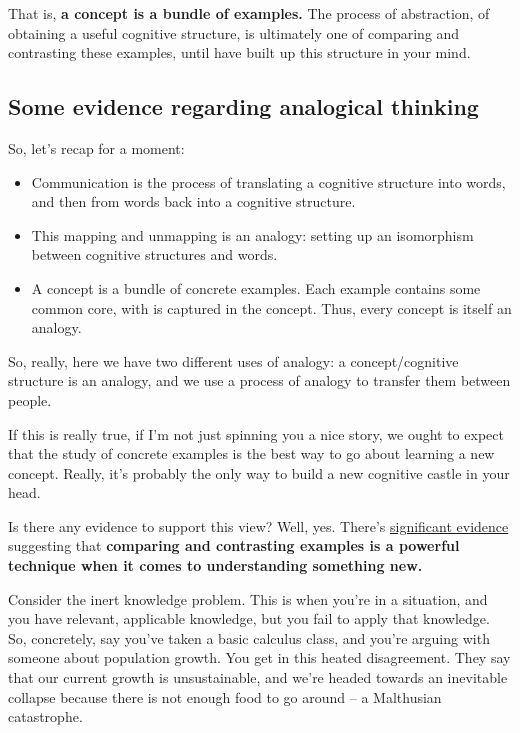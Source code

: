That is, \textbf{a concept is a bundle of examples.} The process of
abstraction, of obtaining a useful cognitive structure, is ultimately
one of comparing and contrasting these examples, until have built up
this structure in your mind.

\subsection{Some evidence regarding analogical
thinking}\label{some-evidence-regarding-analogical-thinking}

So, let's recap for a moment:

\begin{itemize}
\itemsep1pt\parskip0pt
\item
  Communication is the process of translating a cognitive structure into
  words, and then from words back into a cognitive structure.
\item
  This mapping and unmapping is an analogy: setting up an isomorphism
  between cognitive structures and words.
\item
  A concept is a bundle of concrete examples. Each example contains some
  common core, with is captured in the concept. Thus, every concept is
  itself an analogy.
\end{itemize}

So, really, here we have two different uses of analogy: a
concept/cognitive structure is an analogy, and we use a process of
analogy to transfer them between people.

If this is really true, if I'm not just spinning you a nice story, we
ought to expect that the study of concrete examples is the best way to
go about learning a new concept. Really, it's probably the only way to
build a new cognitive castle in your head.

Is there any evidence to support this view? Well, yes. There's
\href{http://psycnet.apa.org/journals/edu/95/2/393/}{significant
evidence} suggesting that \textbf{comparing and contrasting examples is
a powerful technique when it comes to understanding something new.}

Consider the inert knowledge problem. This is when you're in a
situation, and you have relevant, applicable knowledge, but you fail to
apply that knowledge. So, concretely, say you've taken a basic calculus
class, and you're arguing with someone about population growth. You get
in this heated disagreement. They say that our current growth is
unsustainable, and we're headed towards an inevitable collapse because
there is not enough food to go around -- a Malthusian catastrophe.


